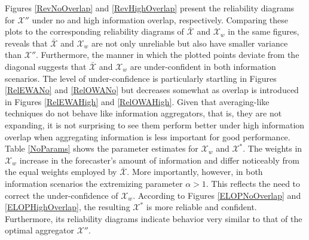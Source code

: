 \documentclass[11pt]{article}
\theoremstyle{definition}
\theoremstyle{definition}
\begin{document}
Figures \ref{RevNoOverlap} and \ref{RevHighOverlap} present the reliability diagrams for $\mathcal{X}''$ under no and high information overlap, respectively. Comparing these plots to the corresponding reliability diagrams of $\bar{\mathcal{X}}$ and $\mathcal{X}_w$ in the same figures, reveals that $\bar{\mathcal{X}}$ and $\mathcal{X}_w$ are not only unreliable but also have smaller variance than $\mathcal{X}''$. Furthermore, the manner in which the plotted points deviate from the diagonal suggests that $\bar{\mathcal{X}}$ and $\mathcal{X}_w$ are under-confident in both information scenarios. The level of under-confidence is particularly startling in Figures \ref{RelEWANo} and \ref{RelOWANo} but decreases somewhat as overlap is introduced in Figures \ref{RelEWAHigh} and \ref{RelOWAHigh}. Given that averaging-like techniques do not behave like information aggregators, that is, they are not expanding, it is not surprising to see them perform better under high information overlap when aggregating information is less important for good performance. Table \ref{NoParams} shows the parameter estimates for $\mathcal{X}_w$ and $\mathcal{X}^*$.  The weights in $\mathcal{X}_w$ increase in the forecaster's amount of information and differ noticeably from the equal weights employed by $\bar{\mathcal{X}}$. 
More importantly, however, in both information scenarios the extremizing parameter $\alpha > 1$. This reflects the need to correct the under-confidence of $\mathcal{X}_w$. According to Figures \ref{ELOPNoOverlap} and \ref{ELOPHighOverlap}, the resulting $\mathcal{X}^*$ is more reliable and confident. Furthermore, its reliability diagrams indicate behavior very similar to that of the optimal aggregator $\mathcal{X}''$. 



\end{document}
